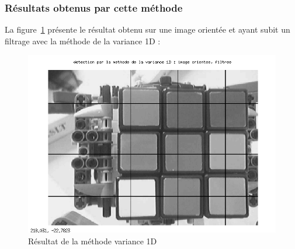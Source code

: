 \subsubsection*{Résultats obtenus par cette méthode}

     La figure~\ref{variance_resultat_1} présente le résultat obtenu sur une image orientée et ayant subit un filtrage avec la méthode de la variance 1D : 
 
 \begin{figure}[!h]
 \centering
 \includegraphics[width=0.9\linewidth]{Images/Variance1D_img_traitement.png} 
 \caption{Résultat de la méthode variance 1D} 
 \label{variance_resultat_1}
 \end{figure}
